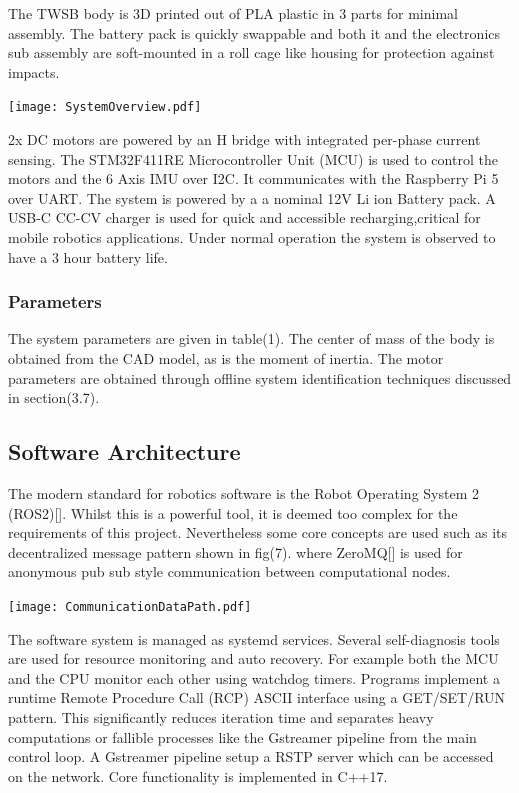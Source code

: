         The TWSB body is 3D printed out of PLA plastic in 3 parts for minimal assembly.
        The battery pack is quickly swappable and both it and the electronics sub assembly 
        are soft-mounted in a roll cage like housing for protection against impacts. 

        \texttt{[image: SystemOverview.pdf]}

        2x DC motors are powered by an H bridge with 
        integrated per-phase current sensing.
        The STM32F411RE Microcontroller Unit (MCU) is used to control the 
        motors and the 6 Axis IMU over I2C. It communicates with the 
        Raspberry Pi 5 over UART. The system is powered by a a nominal 
        12V Li ion Battery pack. A USB-C CC-CV charger is used for quick 
        and accessible recharging,critical for mobile robotics applications.
        Under normal operation the system is observed to have a 3 hour battery life.

        \pagebreak{}
        \subsubsection{Parameters}
        The system parameters are given in table(1). The center of mass of the body is obtained from the CAD model,
        as is the moment of inertia. The motor parameters are obtained through offline system identification techniques
        discussed in section(3.7). 
        \pagebreak{}
        \subsection{Software Architecture}
        The modern standard for robotics software is the Robot Operating System 2 (ROS2)[]. Whilst this is a powerful tool,
        it is deemed too complex for the requirements of this project. Nevertheless some core concepts are used such as its 
        decentralized message pattern shown in fig(7). where ZeroMQ[] is used for 
        anonymous pub sub style communication between computational nodes.

        \texttt{[image: CommunicationDataPath.pdf]}  

        The software system is managed as systemd services. 
        Several self-diagnosis tools are used for resource monitoring and auto recovery. 
        For example both the MCU and the CPU monitor each other using watchdog timers.
        Programs implement a runtime Remote Procedure Call (RCP) ASCII interface using 
        a GET/SET/RUN pattern. This significantly reduces iteration time and separates 
        heavy computations or fallible processes like the Gstreamer pipeline 
        from the main control loop. 
        A Gstreamer pipeline setup a RSTP server
        which can be accessed on the network.
        Core functionality is implemented in C++17. 

